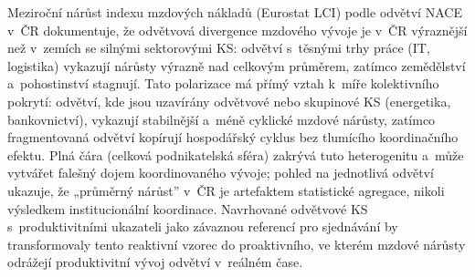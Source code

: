 Meziroční nárůst indexu mzdových nákladů (Eurostat \ac{LCI}) podle odvětví \ac{NACE} v~ČR dokumentuje, že odvětvová divergence mzdového vývoje je v~ČR výraznější než v~zemích se silnými sektorovými \ac{KS}: odvětví s~těsnými trhy práce (IT, logistika) vykazují nárůsty výrazně nad celkovým průměrem, zatímco zemědělství a~pohostinství stagnují.
Tato polarizace má přímý vztah k~míře kolektivního pokrytí: odvětví, kde jsou uzavírány odvětvové nebo skupinové \ac{KS} (energetika, bankovnictví), vykazují stabilnější a~méně cyklické mzdové nárůsty, zatímco fragmentovaná odvětví kopírují hospodářský cyklus bez tlumícího koordinačního efektu.
Plná čára (celková podnikatelská sféra) zakrývá tuto heterogenitu a~může vytvářet falešný dojem koordinovaného vývoje; pohled na jednotlivá odvětví ukazuje, že „průměrný nárůst” v~ČR je artefaktem statistické agregace, nikoli výsledkem institucionální koordinace.
Navrhované odvětvové \ac{KS} s~produktivitními ukazateli jako závaznou referencí pro sjednávání by transformovaly tento reaktivní vzorec do proaktivního, ve kterém mzdové nárůsty odrážejí produktivitní vývoj odvětví v~reálném čase.


